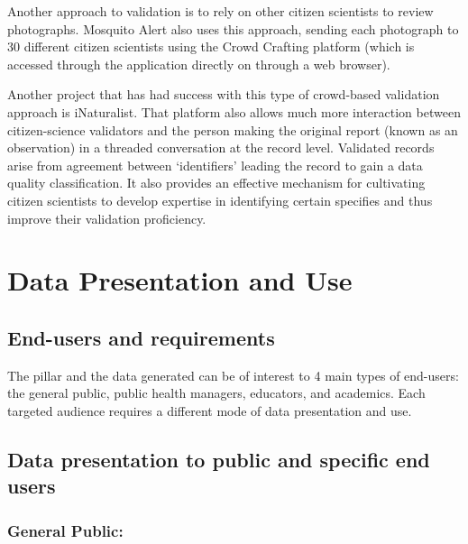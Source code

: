 \documentclass[]{article}
\begin{document}
Another approach to validation is to rely on other citizen scientists to review photographs. Mosquito Alert also uses this approach, sending each photograph to 30 different citizen scientists using the Crowd Crafting platform (which is accessed through the application directly on through a web browser).

Another project that has had success with this type of crowd-based validation approach is iNaturalist. That platform also allows much more interaction between citizen-science validators and the person making the original report (known as an observation) in a threaded conversation at the record level. Validated records arise from agreement between `identifiers' leading the record to gain a data quality classification. It also provides an effective mechanism for cultivating citizen scientists to develop expertise in identifying certain specifies and thus improve their validation proficiency.

\hypertarget{data-presentation-and-use}{%
\section{Data Presentation and Use}\label{data-presentation-and-use}}

\hypertarget{end-users-and-requirements}{%
\subsection{End-users and requirements}\label{end-users-and-requirements}}

The pillar and the data generated can be of interest to 4 main types of end-users: the general public, public health managers, educators, and academics. Each targeted audience requires a different mode of data presentation and use.

\hypertarget{data-presentation-to-public-and-specific-end-users}{%
\subsection{Data presentation to public and specific end users}\label{data-presentation-to-public-and-specific-end-users}}

\hypertarget{general-public}{%
\subsubsection{General Public:}\label{general-public}}
\end{document}
